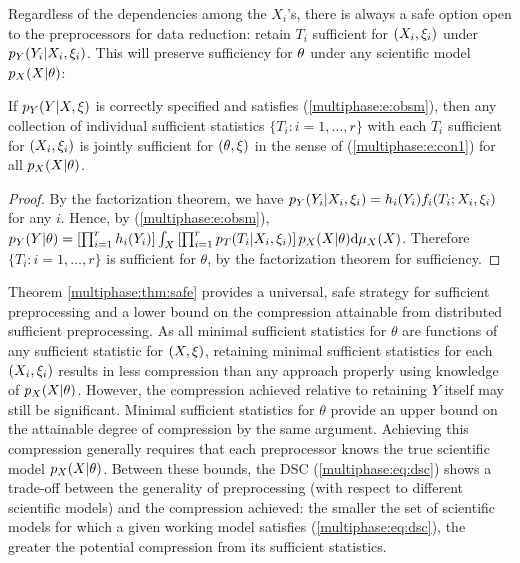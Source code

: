 Regardless of the dependencies among the $X_i$'s, there is always a safe option open to the preprocessors for data reduction: retain $T_i$ sufficient for $(X_i, \xi_i)$ under $p_Y(Y_i | X_i, \xi_i)$.
This will preserve sufficiency for $\theta$ under any scientific model $p_X(X | \theta)$:
%
\begin{theorem}\label{multiphase:thm:safe}
If $p_Y(Y | X, \xi)$ is correctly specified and satisfies (\ref{multiphase:e:obsm}), then any collection of individual sufficient statistics $\{T_i : i=1,\ldots ,r\}$ with each $T_i$ sufficient for $(X_i, \xi_i)$ is jointly sufficient for $(\theta, \xi)$ in the sense of (\ref{multiphase:e:con1}) for all $p_X(X | \theta)$.
\end{theorem}
\begin{proof}
By the factorization theorem, we have $p_Y(Y_i | X_i, \xi_i) = h_i(Y_i) f_i(T_i ; X_i, \xi_i)$ for any $i$. Hence, by (\ref{multiphase:e:obsm}), $ p_Y(Y | \theta) = \left[ \prod_{i=1}^r h_i(Y_i) \right] \int_X \left[ \prod_{i=1}^r p_T(T_i | X_i, \xi_i) \right] p_X(X | \theta) \mathrm{d}\mu_X( X)$.  Therefore $\{T_i : i=1 ,\ldots ,r\}$ is sufficient for $\theta$, by the factorization theorem for sufficiency. 
\end{proof}
%
Theorem \ref{multiphase:thm:safe} provides a universal, safe strategy for sufficient preprocessing and a lower bound on the compression attainable from distributed sufficient preprocessing.
As all minimal sufficient statistics for $\theta$ are functions of any sufficient statistic for $(X, \xi)$, retaining minimal sufficient statistics for each $(X_i, \xi_i)$ results in less compression than any approach properly using knowledge of $p_X(X | \theta)$.
However, the compression achieved relative to retaining $Y$ itself may still be significant.
%
Minimal sufficient statistics for $\theta$ provide an upper bound on the attainable degree of compression by the same argument.
Achieving this compression generally requires that each preprocessor knows the true scientific model $p_X(X | \theta)$.
Between these bounds, the DSC (\ref{multiphase:eq:dsc}) shows a trade-off between the generality of preprocessing (with respect to different scientific models) and the compression achieved: the smaller the set of scientific models for which a given working model satisfies (\ref{multiphase:eq:dsc}), the greater the potential compression from its sufficient statistics.


